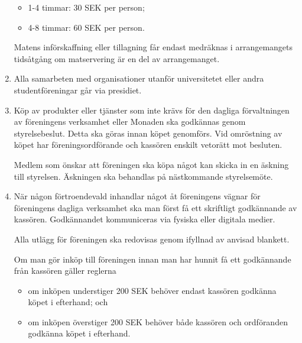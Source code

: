 \documentclass{dvd}
\begin{document}
\begin{enumerate}[label=\arabic* §, ref=\arabic*]
		\begin{itemize}
		\item 1-4 timmar: 30 SEK per person;

		\item 4-8 timmar: 60 SEK per person.
		\end{itemize}

		Matens införskaffning eller tillagning får endast medräknas i arrangemangets tidsåtgång om matservering är en del av arrangemanget.

		\item Alla samarbeten med organisationer utanför universitetet eller andra studentföreningar går via presidiet.

		\item Köp av produkter eller tjänster som inte krävs för den dagliga förvaltningen av föreningens verksamhet eller Monaden ska godkännas genom styrelsebeslut.
		Detta ska göras innan köpet genomförs.
		Vid omröstning av köpet har föreningsordförande och kassören enskilt vetorätt mot besluten.

		Medlem som önskar att föreningen ska köpa något kan skicka in en äskning till styrelsen.
		Äskningen ska behandlas på nästkommande styrelsemöte.

		\item När någon förtroendevald inhandlar något åt föreningens vägnar för föreningens dagliga verksamhet ska man först få ett skriftligt godkännande av kassören.
		Godkännandet kommuniceras via fysiska eller digitala medier.

		Alla utlägg för föreningen ska redovisas genom ifyllnad av anvisad blankett.

		Om man gör inköp till föreningen innan man har hunnit få ett godkännande från kassören gäller reglerna

		\begin{itemize}
		\item om inköpen understiger 200 SEK behöver endast kassören godkänna köpet i efterhand; och

		\item om inköpen överstiger 200 SEK behöver både kassören och ordföranden godkänna köpet i efterhand.
		\end{itemize}
	\end{enumerate}
\end{document}
